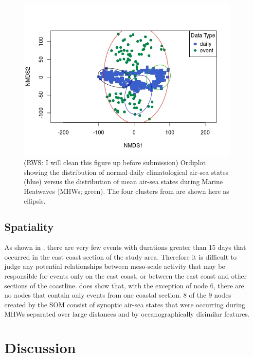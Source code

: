 \documentclass[a4paper,10pt,review]{elsarticle}
\begin{document}
\begin{figure}
\includegraphics[width=1.0\textwidth]{figure_7.jpeg}
\caption{(RWS: I will clean this figure up before submission) Ordiplot showing the distribution of normal daily climatological air-sea states (blue) versus the distribution of mean air-sea states during Marine Heatwaves (MHWs; green). The four clusters from  are shown here as ellipsis.}
\label{figure7}
\end{figure}

\subsection{Spatiality}
As shown in , there are very few events with durations greater than 15 days that occurred in the east coast section of the study area. Therefore it is difficult to judge any potential relationships between meso-scale activity that may be responsible for events only on the east coast, or between the east coast and other sections of the coastline.  does show that, with the exception of node 6, there are no nodes that contain only events from one coastal section. 8 of the 9 nodes created by the SOM consist of synoptic air-sea states that were occurring during MHWs separated over large distances and by oceanographically disimilar features.

\section{Discussion}
\end{document}
